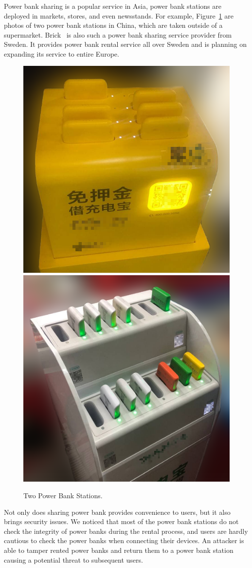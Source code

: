 Power bank sharing is a popular service in Asia, power bank stations are deployed
in markets, stores, and even newsstands. For example, Figure~\ref{fig:PBS_products} are photos
of two power bank stations in China, which are taken outside of a supermarket. Brick~\cite{Brick} is also such a power bank sharing service provider from
Sweden. It provides power bank rental service all over Sweden and is planning on expanding its
service to entire Europe.
\begin{figure}[t]
	\centering
	\includegraphics[width=.45 \linewidth, height=.45 \linewidth]{./Figs/PBS_mt.png}
	\includegraphics[width=.45 \linewidth, height=.45 \linewidth]{./Figs/PBS_xd.png}
	\caption{Two Power Bank Stations.}
	\label{fig:PBS_products}
\end{figure}


Not only does sharing power bank provides convenience to users, but it also
brings security issues.  We noticed that most of the power bank stations do not
check the integrity of power banks during the rental process, and users are
hardly cautious to check the power banks when connecting their devices.  An
attacker is able to tamper rented power banks and return them to a power bank
station causing a potential threat to subsequent users.


